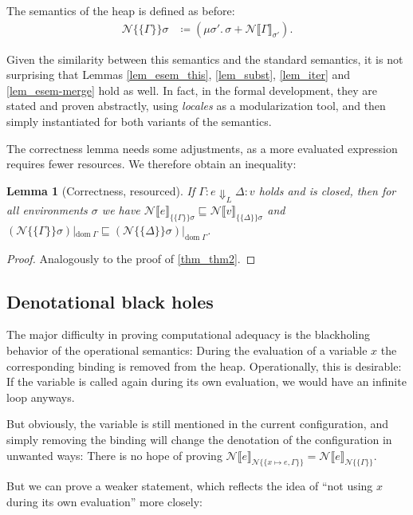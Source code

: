 \documentclass{jfp1}
\newtheorem{lemma}{Lemma}
\theoremstyle{nonumberbreak}
\newtheorem{proof}{Proof}
\newcommand{\sred}[5]{#1 : #2 \Downarrow_{#3} #4 : #5}
\newcommand{\dom}[1]{\text{dom}\;#1}
\newcommand{\esem}[1]{\{\!\!\!\{#1\}\!\!\!\}}
\newcommand{\dsemr}[2]{\mathcal N\!\llbracket #1 \rrbracket_{#2}}
\newcommand{\esemr}[1]{\mathcal N\!\!\{\!\!\!\{#1\}\!\!\!\}}
\newcommand{\upd}[1]{\mathop{++_{#1}}}
\begin{document}
The semantics of the heap is defined as before:
\begin{align*}
\esemr{\Gamma}\sigma &\coloneqq (\mu \sigma'.\, \sigma \upd{\dom \Gamma} \dsemr{\Gamma}{\sigma'}).
\end{align*}

Given the similarity between this semantics and the standard semantics, it is not surprising that Lemmas \ref{lem_esem_this}, \ref{lem_subst}, \ref{lem_iter} and \ref{lem_esem-merge} hold as well. In fact, in the formal development, they are stated and proven abstractly, using \emph{locales} \cite{locales} as a modularization tool, and then simply instantiated for both variants of the semantics.

The correctness lemma needs some adjustments, as a more evaluated expression requires fewer resources. We therefore obtain an inequality:

\begin{lemma}[Correctness, resourced]
If $\sred \Gamma e L \Delta v$ holds and is closed, then for all environments $\sigma$ we have $\dsemr{e}{\esem{\Gamma}{\sigma}} \sqsubseteq \dsemr{v}{\esem{\Delta}{\sigma}}$ and $(\esemr\Gamma\sigma)|_{\dom\Gamma} \sqsubseteq (\esemr\Delta\sigma)|_{\dom\Gamma}$.%
\label{lem_resourced_correctness}
\end{lemma}

\begin{proof}
Analogously to the proof of \autoref{thm_thm2}.
\end{proof}

\subsection{Denotational black holes}
\label{sec_denblackhole}

The major difficulty in proving computational adequacy is the blackholing behavior of the operational semantics: During the evaluation of a variable $x$ the corresponding binding is removed from the heap. Operationally, this is desirable: If the variable is called again during its own evaluation, we would have an infinite loop anyways.

But obviously, the variable is still mentioned in the current configuration, and simply removing the binding will change the denotation of the configuration in unwanted ways: There is no hope of proving $\dsemr{e}{\esemr{x\mapsto e, \Gamma}} = \dsemr{e}{\esemr{\Gamma}}$.

But we can prove a weaker statement, which reflects the idea of ``not using $x$ during its own evaluation'' more closely:
\end{document}

